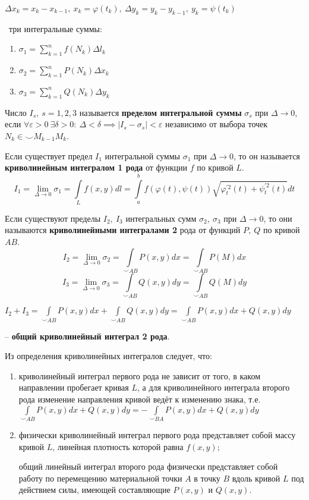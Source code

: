 $\Delta x_k = x_k - x_{k-1},~x_k = \varphi(t_k),~\Delta y_k = y_k - y_{k-1},~y_k = \psi(t_k)$

\faEye \ три интегральные суммы:
\begin{enumerate}
    \item $\sigma_1=\displaystyle\sum_{k=1}^n f(N_k)\Delta l_k$
    \item $\sigma_2=\displaystyle\sum_{k=1}^n P(N_k)\Delta x_k$
    \item $\sigma_3=\displaystyle\sum_{k=1}^n Q(N_k)\Delta y_k$
\end{enumerate}

Число $I_s,~s=1,2,3$ называется \textbf{пределом интегральной суммы} $\sigma_s$ при $\Delta \rightarrow 0$, если $\forall\varepsilon>0~\exists\delta>0:~\Delta<\delta\implies|I_s-\sigma_s|<\varepsilon$ независимо от выбора точек $N_k\in\smile M_{k-1}M_k$.

Если существует предел $I_1$ интегральной суммы $\sigma_1$ при $\Delta \rightarrow 0$, то он называется \textbf{криволинейным интегралом 1 рода} от функции $f$ по кривой $L$.
$$I_1=\displaystyle\lim_{\Delta\to 0}\sigma_1
= \int\limits_{L}f(x,y)dl 
=\int\limits_{a}^{b} f(\varphi(t), \psi(t)) \sqrt{ \varphi_t^{'2}(t) + \psi_t^{'2}(t) } dt $$

Если существуют пределы $I_2,~I_3$ интегральных сумм $\sigma_2,~\sigma_3$ при $\Delta \rightarrow 0$, то они называются \textbf{криволинейными интегралами 2} рода от функций $P,~Q$ по кривой $AB$.
$$I_2=\displaystyle\lim_{\Delta\to 0}\sigma_2= \int\limits_{\smile AB}P(x,y)dx =\int\limits_{\smile AB}P(M)dx $$
$$I_3=\displaystyle\lim_{\Delta\to 0}\sigma_3= \int\limits_{\smile AB}Q(x,y)dy =\int\limits_{\smile AB}Q(M)dy $$

$I_2+I_3=\int\limits_{\smile AB}P(x,y)dx+\int\limits_{\smile AB}Q(x,y)dy = \int\limits_{\smile AB}P(x,y)dx+Q(x,y)dy$ 

-- \textbf{общий криволинейный интеграл 2 рода}.

Из определения криволинейных интегралов следует, что:
\begin{enumerate}
    \item криволинейный интеграл первого рода не зависит от того, в каком направлении пробегает кривая $L$, а для криволинейного интеграла второго рода изменение направления кривой ведёт к изменению знака, т.е. $\int\limits_{\smile AB}P(x,y)dx+Q(x,y)dy=-\int\limits_{\smile BA}P(x,y)dx+Q(x,y)dy$
    \item физически криволинейный интеграл первого рода представляет собой массу кривой $L$, линейная плотность которой равна $f(x, y)$;

    общий линейный интеграл второго рода физически представляет собой работу по перемещению материальной точки $A$ в точку $B$ вдоль кривой $L$ под действием силы, имеющей составляющие $P(x, y)$ и $Q(x, y)$.

\end{enumerate}

